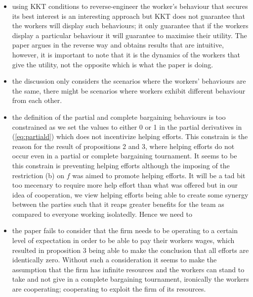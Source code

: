 \documentclass[a4paper,10pt]{article}
\theoremstyle{definition}
\begin{document}
\begin{itemize}
\item  using KKT conditions to reverse-engineer the worker's behaviour that secures its best interest is an interesting approach but KKT does not guarantee that the workers will display such behaviours; it only guarantee that if the workers display a particular behaviour it will guarantee to maximise their utility. The paper argues in the reverse way and obtains results that are intuitive, however, it is important to note that it is the dynamics of the workers that give the utility, not the opposite which is what the paper is doing.

\item the discussion only considers the scenarios where the workers' behaviours are the same, there might be scenarios where workers exhibit different behaviour from each other.

\item the definition of the partial and complete bargaining behaviours is too constrained as we set the values to either 0 or 1 in the partial derivatives in (\ref{eq:partiald}) which does not incentivize helping efforts. This constrain is the reason for the result of propositions 2 and 3, where helping efforts do not occur even in a partial or complete bargaining tournament.  It seems to be this constrain is preventing  helping efforts although the imposing of the restriction (b) on $f$ was aimed to promote helping efforts. It will be a tad bit too mecenary to require more help effort than what was offered but in our idea of cooperation, we view helping efforts being able to create some synergy between the parties such that it reaps greater benefits for the team as compared to everyone working isolatedly. Hence we need to 


\item the paper fails to consider that the firm needs to be operating to a certain level of expectation in order to be able to pay their workers wages, which resulted in proposition 3 being able to make the conclusion that all efforts are identically zero. Without such a consideration it seems to make the assumption that the firm has infinite resources and the workers can stand to take and not give in a complete bargaining tournament, ironically the workers are cooperating; cooperating to exploit the firm of its resources.


\end{itemize}

% 
%
\end{document}

